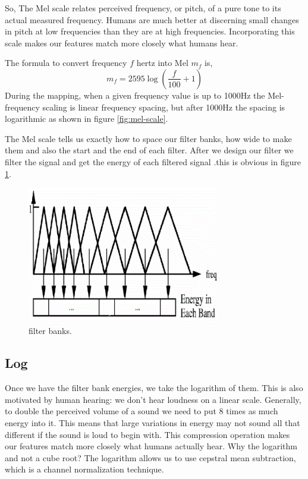 \documentclass[12pt, a4paper, twoside]{report}
\begin{document}
So, The Mel scale relates perceived frequency, or pitch, of a pure tone to its actual measured frequency. Humans are much better at discerning small changes in pitch at low frequencies than they are at high frequencies. Incorporating this scale makes our features match more closely what humans hear.
\par
The formula to convert frequency $f$ hertz into Mel $m_f$ is,  
\begin{equation}
m_f = 2595\log \left ( \frac{f}{100} + 1 \right )
\end{equation}
During the mapping, when a given frequency value is up to 1000Hz  the  Mel-frequency  scaling  is  linear  frequency  spacing,  but  after  1000Hz  the  spacing  is logarithmic as shown in figure \ref{fig:mel-scale}.
\par
The Mel scale tells us exactly how to space our filter banks, how wide to make them and also   the start and the end of each filter. After we design our filter we filter the signal and get the energy of each filtered signal .this is obvious in figure \ref{fig:mel-banks}.

\begin{figure}[!h]
	\centering
	\includegraphics[width=0.75\textwidth]
	{images/chapter3/mel-banks}
	\caption{filter banks.}
	\label{fig:mel-banks}
\end{figure}

\subsection{Log}
Once we have the filter bank energies, we take the logarithm of them. This is also motivated by human hearing: we don't hear loudness on a linear scale. Generally, to double the perceived volume of a sound we need to put 8 times as much energy into it. This means that large variations in energy may not sound all that different if the sound is loud to begin with. This compression operation makes our features match more closely what humans actually hear. Why the logarithm and not a cube root? The logarithm allows us to use cepstral mean subtraction, which is a channel normalization technique.
\end{document}
